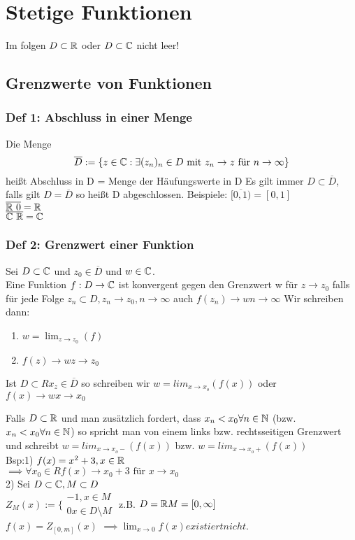 \chapter{Stetige Funktionen} 
Im folgen $D \subset \mathbb{R}$ oder $D \subset \mathbb{C}$ nicht leer!

\section{Grenzwerte von Funktionen}
\subsection{Def 1: Abschluss in einer Menge}
Die Menge 
$$ \overline{D} := \{ z \in \mathbb{C} : \exists (z_n)_n \in D \text{ mit } z_n \to z \text{ für } n \to \infty\} $$
heißt Abschluss in D = Menge der Häufungswerte in D
Es gilt immer $D \subset \overline{D}$, falls gilt $D = \overline{D}$ so heißt D abgeschlossen.
Beispiele:
$\overline{[0,1)} = [0,1]$  \\
$\overline{\mathbb{R} \ {0}} = \mathbb{R} $ \\
$\overline{\mathbb{C} \ \mathbb{R}} = \mathbb{C} $

\subsection{Def 2: Grenzwert einer Funktion}
Sei $D \subset \mathbb{C} $ und $z_0 \in \overline{D}$ und $w \in \mathbb{C}$. \\
Eine Funktion $f: D \to \mathbb{C}$ ist konvergent gegen den Grenzwert w für $z \to z_0$ falls für jede Folge 
$z_n \subset D, z_n \to z_0, n \to \infty$ auch $f(z_n) \to w n\to \infty$
Wir schreiben dann: 
\begin{enumerate}
 \item $w = \lim_{z\to z_0} (f)$
 \item $f(z) \to w z\to z_0$
\end{enumerate}
Ist $D \subset R x_z \in \overline{D}$ so schreiben wir
$w = lim_{x\to x_o} (f(x))$ oder $f(x) \to w x\to x_0$

Falls $D \subset \mathbb{R}$ und man zusätzlich fordert, dass $x_n < x_0 \forall n \in \mathbb{N}$ (bzw. $x_n < x_0 \forall n \in \mathbb{N}$)
so spricht man von einem links bzw. rechtsseitigen Grenzwert und schreibt $w = lim_{x\to x_o-} (f(x))$ bzw. $w = lim_{x\to x_o+} (f(x))$
\\
Bsp:1) $f(x) = x^2 +3, x \in \mathbb{R}$ \\
$\implies \forall x_0 \in R f(x) \to x_0 +3 \text{ für }x \to x_0$ \\
2) Sei $D \subset \mathbb{C}, M \subset D$ \\
  $Z_M(x) :=  \{ \begin{array}{cc}
                -1, x \in M \\ 0 x\in D \setminus M
               \end{array}
$
z.B. $D = \mathbb{R} M = [0, \infty]$ \\
$f(x) = Z_{[0,m]}(x)$
$\implies \lim_{x\to 0} f(x) existiert nicht.$






